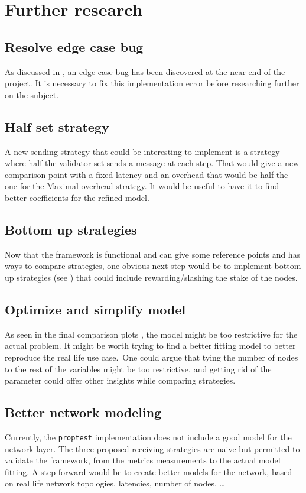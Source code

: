 \FloatBarrier
\section{Further research}

\subsection{Resolve edge case bug}
As discussed in , an edge case bug has been discovered at
the near end of the project. It is necessary to fix this implementation error
before researching further on the subject.

\subsection{Half set strategy}
A new sending strategy that could be interesting to implement is a strategy
where half the validator set sends a message at each step. That would give a new
comparison point with a fixed latency and an overhead that would be half the one
for the Maximal overhead strategy. It would be useful to have it to find better
coefficients for the refined model.

\subsection{Bottom up strategies}
Now that the framework is functional and can give some reference points and has
ways to compare strategies, one obvious next step would be to implement bottom
up strategies (see ) that could include rewarding/slashing the stake of the nodes.

\subsection{Optimize and simplify model}
As seen in the final comparison plots , the model might be too restrictive for
the actual problem. It might be worth trying to find a better fitting model to
better reproduce the real life use case.\
One could argue that tying the number of nodes to the rest of the variables
might be too restrictive, and getting rid of the parameter could offer other
insights while comparing strategies.

\subsection{Better network modeling}
Currently, the \texttt{proptest} implementation does not include a good model
for the network layer. The three proposed receiving strategies are naive but
permitted to validate the framework, from the metrics measurements to the actual
model fitting. A step forward would be to create better models for the
network, based on real life network topologies, latencies, number of nodes, \ldots

